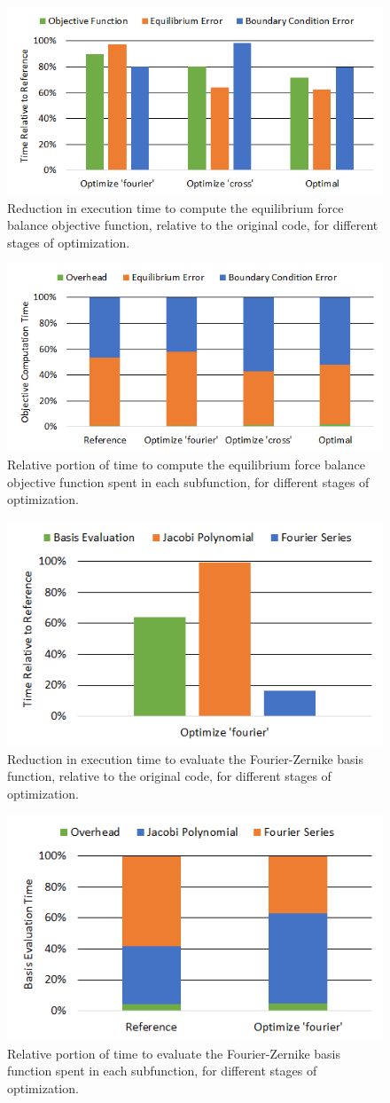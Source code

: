 \documentclass{article}
\begin{document}
%
\begin{figure}[H]
	\centering
	\includegraphics[width=0.6\linewidth,center]{./figs/compute_time_opt.png}
	\caption{Reduction in execution time to compute the equilibrium force balance objective function, relative to the original code, for different stages of optimization.}
	\label{fig:compute_opt}
\end{figure}
%
\begin{figure}[H]
	\centering
	\includegraphics[width=0.6\linewidth,center]{./figs/compute_time_rel.png}
	\caption{Relative portion of time to compute the equilibrium force balance objective function spent in each subfunction, for different stages of optimization.}
	\label{fig:compute_opt}
\end{figure}
%
\begin{figure}[H]
	\centering
	\includegraphics[width=0.6\linewidth,center]{./figs/compile_time_opt.png}
	\caption{Reduction in execution time to evaluate the Fourier-Zernike basis function, relative to the original code, for different stages of optimization.}
	\label{fig:compute_opt}
\end{figure}
%
\begin{figure}[H]
	\centering
	\includegraphics[width=0.6\linewidth,center]{./figs/compile_time_rel.png}
	\caption{Relative portion of time to evaluate the Fourier-Zernike basis function spent in each subfunction, for different stages of optimization.}
	\label{fig:compute_opt}
\end{figure}
\end{document}
